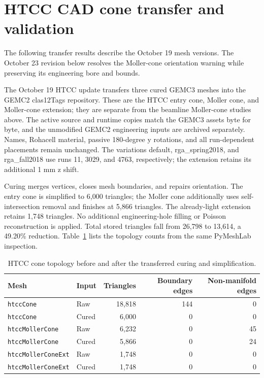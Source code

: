 \FloatBarrier

\section{HTCC CAD cone transfer and validation}
\label{sec:htcc}

The following transfer results describe the October 19 mesh versions. The October 23 revision below resolves
the Moller-cone orientation warning while preserving its engineering bore and bounds.

The October 19 HTCC update transfers three cured GEMC3 meshes into the GEMC2 clas12Tags repository. These are
the HTCC entry cone, Moller cone, and Moller-cone extension; they are separate from the beamline Moller-cone
studies above. The active source and runtime copies match the GEMC3 assets byte for byte, and the unmodified
GEMC2 engineering inputs are archived separately. Names, Rohacell material, passive 180-degree y rotations,
and all run-dependent placements remain unchanged. The variations default, rga\_spring2018, and rga\_fall2018
use runs 11, 3029, and 4763, respectively; the extension retains its additional 1 mm z shift.

Curing merges vertices, closes mesh boundaries, and repairs orientation. The entry cone is simplified to 6,000
triangles; the Moller cone additionally uses self-intersection removal and finishes at 5,866 triangles. The
already-light extension retains 1,748 triangles. No additional engineering-hole filling or Poisson
reconstruction is applied. Total stored triangles fall from 26,798 to 13,614, a 49.20\% reduction.
Table~\ref{tab:htcc-mesh} lists the topology counts from the same PyMeshLab inspection.


\begin{table}[htbp]
\centering
\caption{HTCC cone topology before and after the transferred curing and simplification.}
\label{tab:htcc-mesh}
\setlength{\tabcolsep}{5pt}
\begin{tabular}{llrrr}
\toprule
Mesh & Input & Triangles & Boundary edges & Non-manifold edges \\
\midrule
\texttt{htccCone} & Raw & 18,818 & 144 & 0 \\
\texttt{htccCone} & Cured & 6,000 & 0 & 0 \\
\texttt{htccMollerCone} & Raw & 6,232 & 0 & 45 \\
\texttt{htccMollerCone} & Cured & 5,866 & 0 & 24 \\
\texttt{htccMollerConeExt} & Raw & 1,748 & 0 & 0 \\
\texttt{htccMollerConeExt} & Cured & 1,748 & 0 & 0 \\
\bottomrule
\end{tabular}
\end{table}

